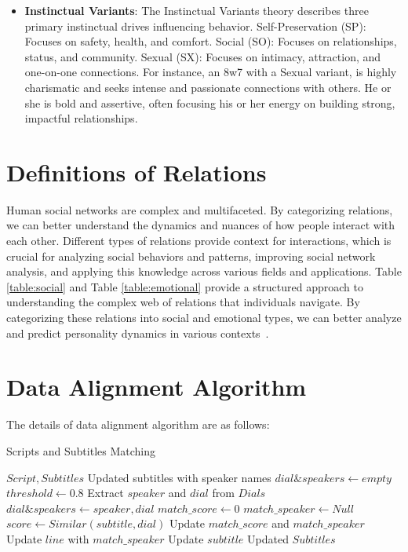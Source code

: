 \begin{itemize}
  \item \textbf{Instinctual Variants}: The Instinctual Variants theory describes three primary instinctual drives influencing behavior. Self-Preservation (SP): Focuses on safety, health, and comfort. Social (SO): Focuses on relationships, status, and community. Sexual (SX): Focuses on intimacy, attraction, and one-on-one connections. For instance, an 8w7 with a Sexual variant, is highly charismatic and seeks intense and passionate connections with others. He or she is bold and assertive, often focusing his or her energy on building strong, impactful relationships.
\end{itemize}

\section{Definitions of Relations}
\label{sec:appendixB}
Human social networks are complex and multifaceted. By categorizing relations, we can better understand the dynamics and nuances of how people interact with each other. Different types of relations provide context for interactions, which is crucial for analyzing social behaviors and patterns, improving social network analysis, and applying this knowledge across various fields and applications.
Table \ref{table:social} and Table \ref{table:emotional} provide a structured approach to understanding the complex web of relations that individuals navigate. By categorizing these relations into social and emotional types, we can better analyze and predict personality dynamics in various contexts~\citep{Collins_Sroufe_1999, 10.1093/acprof:oso/9780195150100.001.0001}. 



\section{Data Alignment Algorithm}
\label{sec:appendixC}
The details of data alignment algorithm are as follows:
\begin{algorithm}[!h]
	\small
	\caption{Scripts and Subtitles Matching}
	\label{alg:Matching}
	\renewcommand{\algorithmicrequire}{\textbf{Input:}}
	\renewcommand{\algorithmicensure}{\textbf{Output:}}
	
	\begin{algorithmic}[1]
		\REQUIRE $Script, Subtitles$
		\ENSURE Updated subtitles with speaker names
		\STATE $dial \& speakers \gets empty$
		\STATE $threshold \gets 0.8$
		\STATE Extract $speaker$ and $dial$ from $Dials$
		\STATE $dial \& speakers \gets speaker, dial$ 
		\ENDFOR
		\ENDFOR
		\STATE $match\_score \gets 0$
		\STATE $match\_speaker \gets Null$
		\STATE $score \gets Similar(subtitle, dial)$
		\STATE Update $match\_score$ and $match\_speaker$
		\ENDIF
		\ENDFOR
		\STATE Update $line$ with $match\_speaker$
		\ENDIF
		\ENDFOR
		\STATE Update $subtitle$
		\ENDFOR
		\RETURN Updated $Subtitles$
	\end{algorithmic}
\end{algorithm}

